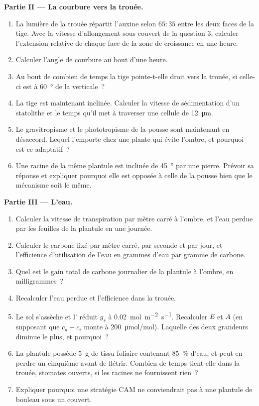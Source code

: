 \begin{problem}
\medskip
\noindent\textbf{Partie II --- La courbure vers la trouée.}
\begin{enumerate}[resume]
  \item La lumière de la trouée répartit l'auxine selon $65 : 35$ entre
        les deux faces de la tige. Avec la vitesse d'allongement sous
        couvert de la question 3, calculer l'extension relative de chaque
        face de la zone de croissance en une heure.
  \item Calculer l'angle de courbure au bout d'une heure.
  \item Au bout de combien de temps la tige pointe-t-elle droit vers la
        trouée, si celle-ci est à \qty{60}{\degree} de la verticale~?
  \item La tige est maintenant inclinée. Calculer la vitesse de
        sédimentation d'un statolithe et le temps qu'il met à traverser
        une cellule de \qty{12}{\micro m}.
  \item Le gravitropisme et le phototropisme de la pousse sont
        maintenant en désaccord. Lequel l'emporte chez une plante qui
        évite l'ombre, et pourquoi est-ce adaptatif~?
  \item Une racine de la même plantule est inclinée de \qty{45}{\degree}
        par une pierre. Prévoir sa réponse et expliquer pourquoi elle est
        opposée à celle de la pousse bien que le mécanisme soit le même.
\end{enumerate}

\medskip
\noindent\textbf{Partie III --- L'eau.}
\begin{enumerate}[resume]
  \item Calculer la vitesse de transpiration par mètre carré à l'ombre,
        et l'eau perdue par les feuilles de la plantule en une journée.
  \item Calculer le carbone fixé par mètre carré, par seconde et par
        jour, et l'efficience d'utilisation de l'eau en grammes d'eau par
        gramme de carbone.
  \item Quel est le gain total de carbone journalier de la plantule à
        l'ombre, en milligrammes~?
  \item Recalculer l'eau perdue et l'efficience dans la trouée.
  \item Le sol s'assèche et l' réduit $g_s$ à
        \qty{0.02}{mol.m^{-2}.s^{-1}}. Recalculer $E$ et $A$ (en
        supposant que $c_a - c_i$ monte à \qty{200}{\micro mol/mol}).
        Laquelle des deux grandeurs diminue le plus, et pourquoi~?
  \item La plantule possède \qty{5}{g} de tissu foliaire contenant
        \qty{85}{\%} d'eau, et peut en perdre un cinquième avant de
        flétrir. Combien de temps tient-elle dans la trouée, stomates
        ouverts, si les racines ne fournissent rien~?
  \item Expliquer pourquoi une stratégie CAM ne conviendrait pas à une
        plantule de bouleau sous un couvert.
\end{enumerate}


\end{problem}
